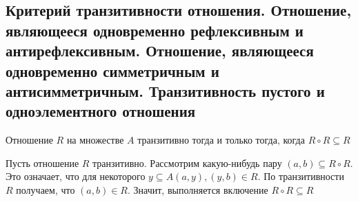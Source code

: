 \documentclass[a4paper]{article}
\begin{document}

 \subsection{Критерий транзитивности отношения. Отношение, являющееся одновременно рефлексивным и антирефлексивным. Отношение, являющееся одновременно симметричным и антисимметричным. Транзитивность пустого и одноэлементного отношения}
\label{sec:2.41}\theorem Отношение $R$ на множестве $A$ транзитивно тогда и только тогда, когда $R\circ R\subseteq R$

\proof Пусть отношение $R$ транзитивно. Рассмотрим какую-нибудь пару $(a, b)\subseteq R\circ R$. Это означает, что для некоторого $y\subseteq A (a, y), (y, b) \in R$. По транзитивности $R$ получаем, что $(a, b)\in R$. Значит, выполняется включение $R\circ R\subseteq R$
\end{document}
